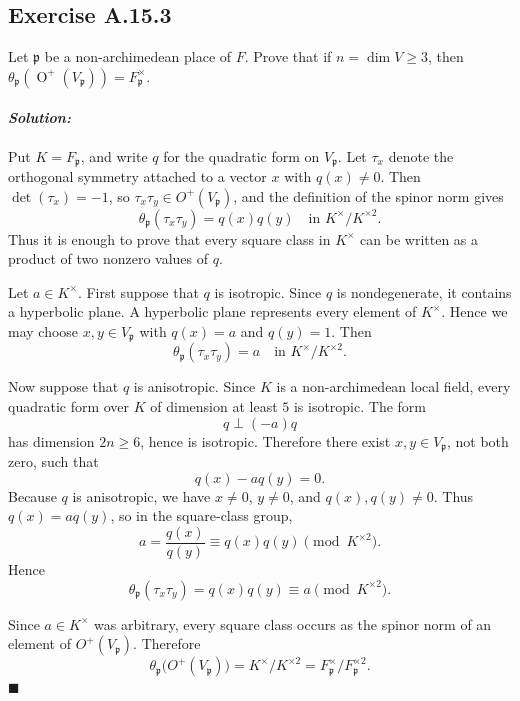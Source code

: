 \documentclass[12pt, a4paper]{article}
\newenvironment{solution}
  {\paragraph{\textit{Solution:}}\par\medskip}
  {\hfill$\blacksquare$\vspace{0.1cm}}
\begin{document}
\subsection*{Exercise A.15.3}
Let $\mathfrak{p}$ be a non-archimedean place of $F$. Prove that if $n = \dim V \ge 3$, then $\theta_{\mathfrak{p}}(\operatorname{O}^+(V_{\mathfrak{p}})) = F_{\mathfrak{p}}^\times$.
\begin{solution}
Put \(K=F_{\mathfrak p}\), and write \(q\) for the quadratic form on
\(V_{\mathfrak p}\). Let \(\tau_x\) denote the orthogonal symmetry attached to
a vector \(x\) with \(q(x)\neq 0\). Then \(\det(\tau_x)=-1\), so
\(\tau_x\tau_y\in O^+(V_{\mathfrak p})\), and the definition of the spinor norm
gives
\[
\theta_{\mathfrak p}(\tau_x\tau_y)
= q(x)q(y) \quad \text{in } K^\times/K^{\times 2}.
\]
Thus it is enough to prove that every square class in \(K^\times\) can be
written as a product of two nonzero values of \(q\).

Let \(a\in K^\times\). First suppose that \(q\) is isotropic. Since \(q\) is
nondegenerate, it contains a hyperbolic plane. A hyperbolic plane represents
every element of \(K^\times\). Hence we may choose \(x,y\in V_{\mathfrak p}\)
with \(q(x)=a\) and \(q(y)=1\). Then
\[
\theta_{\mathfrak p}(\tau_x\tau_y)=a
\quad \text{in } K^\times/K^{\times 2}.
\]

Now suppose that \(q\) is anisotropic. Since \(K\) is a non-archimedean local
field, every quadratic form over \(K\) of dimension at least \(5\) is isotropic.
The form
\[
q\perp (-a)q
\]
has dimension \(2n\ge 6\), hence is isotropic. Therefore there exist
\(x,y\in V_{\mathfrak p}\), not both zero, such that
\[
q(x)-a q(y)=0.
\]
Because \(q\) is anisotropic, we have \(x\neq 0\), \(y\neq 0\), and
\(q(x),q(y)\neq 0\). Thus \(q(x)=a q(y)\), so in the square-class group,
\[
a=\frac{q(x)}{q(y)}\equiv q(x)q(y)
\pmod{K^{\times 2}}.
\]
Hence
\[
\theta_{\mathfrak p}(\tau_x\tau_y)
=q(x)q(y)
\equiv a
\pmod{K^{\times 2}}.
\]

Since \(a\in K^\times\) was arbitrary, every square class occurs as the spinor
norm of an element of \(O^+(V_{\mathfrak p})\). Therefore
\[
\theta_{\mathfrak p}\bigl(O^+(V_{\mathfrak p})\bigr)
=K^\times/K^{\times 2}
=F_{\mathfrak p}^{\times}/F_{\mathfrak p}^{\times 2}.
\]
\end{solution}
\end{document}
